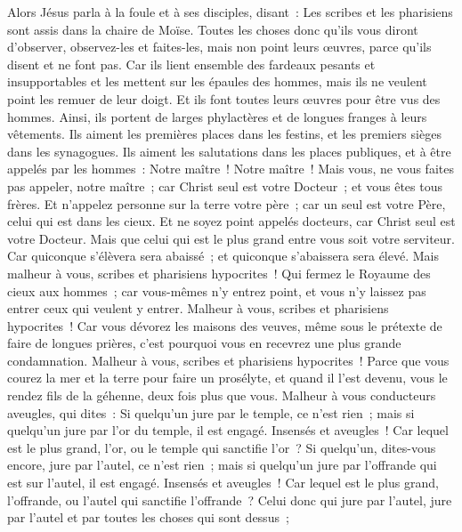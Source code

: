 \begin{multicols}{2}
\VerseOne{}Alors Jésus parla à la foule et à ses disciples,
disant~: Les scribes et les pharisiens sont assis dans la chaire de Moïse.
Toutes les choses donc qu'ils vous diront d'observer, observez-les et faites-les, mais non point leurs œuvres, parce qu'ils disent et ne font pas.
Car ils lient ensemble des fardeaux pesants et insupportables et les mettent sur les épaules des hommes, mais ils ne veulent point les remuer de leur doigt.
Et ils font toutes leurs œuvres pour être vus des hommes. Ainsi, ils portent de larges phylactères et de longues franges à leurs vêtements.
Ils aiment les premières places dans les festins, et les premiers sièges dans les synagogues.
Ils aiment les salutations dans les places publiques, et à être appelés par les hommes~: Notre maître~! Notre maître~!
Mais vous, ne vous faites pas appeler, notre maître~; car Christ seul est votre Docteur~; et vous êtes tous frères.
Et n'appelez personne sur la terre votre père~; car un seul est votre Père, celui qui est dans les cieux.
Et ne soyez point appelés docteurs, car Christ seul est votre Docteur.
Mais que celui qui est le plus grand entre vous soit votre serviteur.
Car quiconque s'élèvera sera abaissé~; et quiconque s'abaissera sera élevé.
Mais malheur à vous, scribes et pharisiens hypocrites~! Qui fermez le Royaume des cieux aux hommes~; car vous-mêmes n'y entrez point, et vous n'y laissez pas entrer ceux qui veulent y entrer.
Malheur à vous, scribes et pharisiens hypocrites~! Car vous dévorez les maisons des veuves, même sous le prétexte de faire de longues prières, c'est pourquoi vous en recevrez une plus grande condamnation.
Malheur à vous, scribes et pharisiens hypocrites~! Parce que vous courez la mer et la terre pour faire un prosélyte, et quand il l'est devenu, vous le rendez fils de la géhenne, deux fois plus que vous.
Malheur à vous conducteurs aveugles, qui dites~: Si quelqu'un jure par le temple, ce n'est rien~; mais si quelqu'un jure par l'or du temple, il est engagé.
Insensés et aveugles~! Car lequel est le plus grand, l'or, ou le temple qui sanctifie l'or~?
Si quelqu'un, dites-vous encore, jure par l'autel, ce n'est rien~; mais si quelqu'un jure par l'offrande qui est sur l'autel, il est engagé.
Insensés et aveugles~! Car lequel est le plus grand, l'offrande, ou l'autel qui sanctifie l'offrande~?
Celui donc qui jure par l'autel, jure par l'autel et par toutes les choses qui sont dessus~;

\end{multicols}
